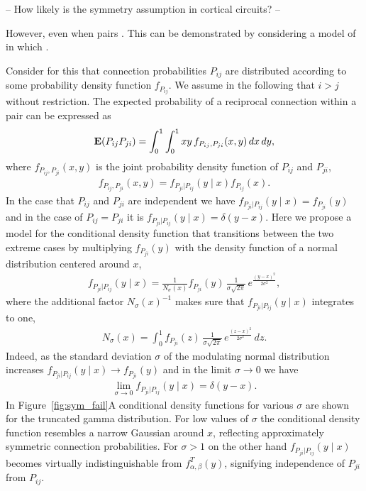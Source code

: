 
-- How likely is the symmetry assumption in cortical circuits? --

However, even when pairs . This can be demonstrated by considering a model of in which .

Consider for this that connection probabilities $P_{ij}$ are distributed according to some probability density function $f_{P_{ij}}$. We assume in the following that $i > j$ without restriction. The expected probability of a reciprocal connection within a pair can be expressed as
%
\begin{align}
  \operatorname{\mathbf{E}}(P_{ij}P_{ji}) = \int_0^1 \int_0^1 xy\, f_{P_{ij},P_{ji}}(x,y) \, dx\, dy, \label{eq:dbint}
\end{align}
%
where $f_{P_{ij},P_{ji}}(x,y)$ is the joint probability density function of $P_{ij}$ and $P_{ji}$, 
%
\begin{align}
  f_{P_{ij},P_{ji}}(x,y) =  f_{P_{ji} | P_{ij}}(y \mid x) f_{P_{ij}}(x). \label{eq:cdf_def}
\end{align}
%
In the case that $P_{ij}$ and $P_{ji}$ are independent we have $f_{P_{ji} | P_{ij}}(y \mid x) = f_{P_{ji}}(y)$ and in the case of $P_{ij}=P_{ji}$ it is $f_{P_{ji} | P_{ij}}(y \mid x) = \delta(y-x)$. Here we propose a model for the conditional density function that transitions between the two extreme cases by multiplying $f_{P_{ji}}(y)$ with the density function of a normal distribution centered around $x$,
%
\begin{align}
  f_{P_{ji} | P_{ij}} (y \mid x) = \frac{1}{N_{\sigma}(x)} f_{P_{ji}}(y)\, \frac{1}{\sigma \sqrt{2 \pi}} \,e^{\frac{(y-x)^2}{2 \sigma^2}} \label{eq:fpijpji},
\end{align}
%
where the additional factor $N_{\sigma}(x)^{-1}$  makes sure that $f_{P_{ji}|P_{ij}} (y \mid x)$ integrates to one,
%
\begin{align}
  N_{\sigma}(x) = \int_0^1 f_{P_{ji}}(z)\, \frac{1}{\sigma \sqrt{2 \pi}}\, e^{\frac{(z-x)^2}{2 \sigma^2}} \,dz.
\end{align}
%
Indeed, as the standard deviation $\sigma$ of the modulating normal distribution increases $f_{P_{ji}|P_{ij}} (y \mid x) \to f_{P_{ji}}(y)$ and in the limit $\sigma \to 0$ we have
\begin{align}
  \lim_{\sigma \to 0}   f_{P_{ji}|P_{ij}} (y \mid x) = \delta(y-x).
\end{align}
%
In Figure~\ref{fig:sym_fail}A  conditional density functions for various $\sigma$ are shown for the truncated gamma distribution. For low values of $\sigma$ the conditional density function resembles a narrow Gaussian around $x$, reflecting approximately symmetric connection probabilities. For $\sigma > 1$ on the other hand $f_{P_{ji} | P_{ij}}(y \mid x)$ becomes virtually indistinguishable from $f^T_{\alpha, \beta}(y)$, signifying independence of $P_{ji}$ from $P_{ij}$.

